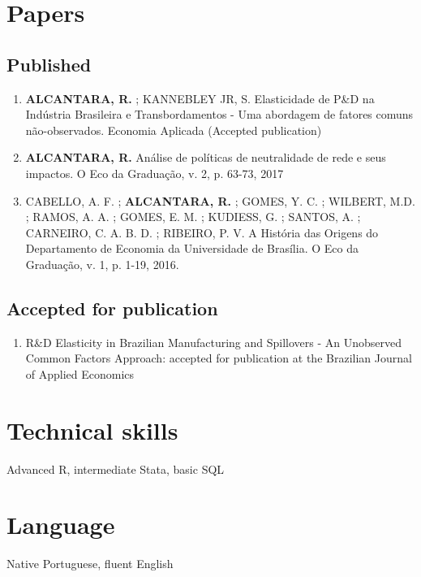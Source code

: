\documentclass[11pt]{article}
\begin{document}
\section*{Papers}
\label{sec:org1888aa6}
\subsection*{Published}
\label{sec:org7e183fa}
\begin{enumerate}
\item \textbf{ALCANTARA, R.} ; KANNEBLEY JR, S. Elasticidade de P\&D na Indústria Brasileira e Transbordamentos - Uma abordagem de fatores comuns não­-observados. Economia Aplicada (Accepted publication)
\item \textbf{ALCANTARA, R.} Análise de políticas de neutralidade de rede e seus impactos. O Eco da Graduação, v. 2, p. 63-73, 2017
\item CABELLO, A. F. ; \textbf{ALCANTARA, R.} ; GOMES, Y. C. ; WILBERT,
M.D. ; RAMOS, A. A. ; GOMES, E. M. ; KUDIESS, G. ; SANTOS, A. ;
CARNEIRO, C. A. B. D. ; RIBEIRO, P. V. A História das Origens do
Departamento de Economia da Universidade de Brasília. O Eco da
Graduação, v. 1, p. 1-19, 2016.
\end{enumerate}
\subsection*{Accepted for publication}
\label{sec:orga4b9f0b}
\begin{enumerate}
\item R\&D Elasticity in Brazilian Manufacturing and
Spillovers - An Unobserved Common Factors Approach:
accepted for publication at the Brazilian Journal of
Applied Economics
\end{enumerate}
\section*{Technical skills}
\label{sec:org81aac04}
Advanced R, intermediate Stata, basic SQL
\section*{Language}
\label{sec:org2015a14}
Native Portuguese, fluent English
\end{document}
